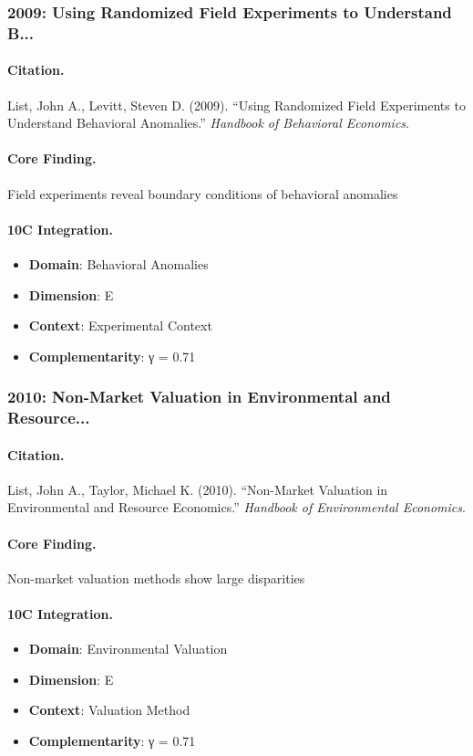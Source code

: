 \subsubsection{2009: Using Randomized Field Experiments to Understand B...}

\paragraph{Citation.}
List, John A., Levitt, Steven D. (2009). ``Using Randomized Field Experiments to Understand Behavioral Anomalies.''
\textit{Handbook of Behavioral Economics}.

\paragraph{Core Finding.}
Field experiments reveal boundary conditions of behavioral anomalies

\paragraph{10C Integration.}
\begin{itemize}[nosep]
  \item \textbf{Domain}: Behavioral Anomalies
  \item \textbf{Dimension}: E
  \item \textbf{Context}: Experimental Context
  \item \textbf{Complementarity}: γ = 0.71
\end{itemize}


\subsubsection{2010: Non-Market Valuation in Environmental and Resource...}

\paragraph{Citation.}
List, John A., Taylor, Michael K. (2010). ``Non-Market Valuation in Environmental and Resource Economics.''
\textit{Handbook of Environmental Economics}.

\paragraph{Core Finding.}
Non-market valuation methods show large disparities

\paragraph{10C Integration.}
\begin{itemize}[nosep]
  \item \textbf{Domain}: Environmental Valuation
  \item \textbf{Dimension}: E
  \item \textbf{Context}: Valuation Method
  \item \textbf{Complementarity}: γ = 0.71
\end{itemize}


